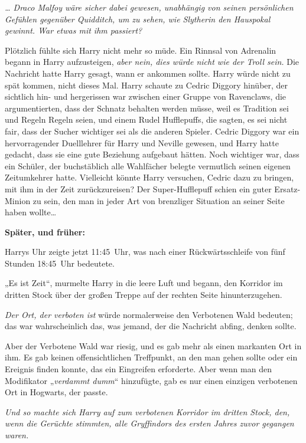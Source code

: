{\emph{… Draco Malfoy wäre sicher dabei gewesen, unabhängig von seinen persönlichen Gefühlen gegenüber Quidditch, um zu sehen, wie Slytherin den Hauspokal gewinnt. War etwas mit ihm passiert?}

Plötzlich fühlte sich Harry nicht mehr so müde. Ein Rinnsal von Adrenalin begann in Harry aufzusteigen, \emph{aber nein, dies würde nicht wie der Troll sein.} Die Nachricht hatte Harry gesagt, wann er ankommen sollte. Harry würde nicht zu spät kommen, nicht dieses Mal. Harry schaute zu Cedric Diggory hinüber, der sichtlich hin- und hergerissen war zwischen einer Gruppe von Ravenclaws, die argumentierten, dass der Schnatz behalten werden müsse, weil es Tradition sei und Regeln Regeln seien, und einem Rudel Hufflepuffs, die sagten, es sei nicht fair, dass der Sucher wichtiger sei als die anderen Spieler. Cedric Diggory war ein hervorragender Duelllehrer für Harry und Neville gewesen, und Harry hatte gedacht, dass sie eine gute Beziehung aufgebaut hätten. Noch wichtiger war, dass ein Schüler, der buchstäblich alle Wahlfächer belegte vermutlich seinen eigenen Zeitumkehrer hatte. Vielleicht könnte Harry versuchen, Cedric dazu zu bringen, mit ihm in der Zeit zurückzureisen? Der Super-Hufflepuff schien ein guter Ersatz-Minion zu sein, den man in jeder Art von brenzliger Situation an seiner Seite haben wollte…

\textbf{Später, und früher:}

Harrys Uhr zeigte jetzt 11:45~Uhr, was nach einer Rückwärtsschleife von fünf Stunden 18:45~Uhr bedeutete.

„Es ist Zeit“, murmelte Harry in die leere Luft und begann, den Korridor im dritten Stock über der großen Treppe auf der rechten Seite hinunterzugehen.

\emph{Der Ort, der verboten ist} würde normalerweise den Verbotenen Wald bedeuten; das war wahrscheinlich das, was jemand, der die Nachricht abfing, denken sollte.

Aber der Verbotene Wald war riesig, und es gab mehr als einen markanten Ort in ihm. Es gab keinen offensichtlichen Treffpunkt, an den man gehen sollte oder ein Ereignis finden konnte, das ein Eingreifen erforderte. Aber wenn man den Modifikator „\emph{verdammt dumm}“ hinzufügte, gab es nur einen einzigen verbotenen Ort in Hogwarts, der passte.

\emph{Und so machte sich Harry auf zum verbotenen Korridor im dritten Stock, den, wenn die Gerüchte stimmten, alle Gryffindors des ersten Jahres zuvor gegangen waren.}

}
